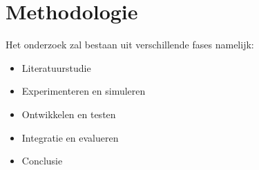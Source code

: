 

\section{Methodologie}%
\label{sec:methodologie}


Het onderzoek zal bestaan uit verschillende fases namelijk:
    \begin{itemize}
        \item Literatuurstudie
        \item Experimenteren en simuleren
        \item Ontwikkelen en testen
        \item Integratie en evalueren
        \item Conclusie
    \end{itemize}

